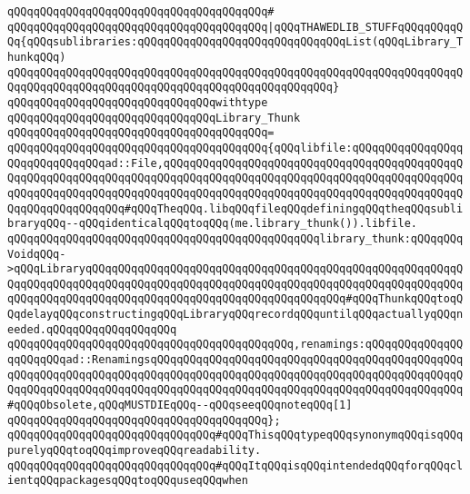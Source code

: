 \verb|qQQqqQQqqQQqqQQqqQQqqQQqqQQqqQQqqQQqqQQq#|\newline
\verb|qQQqqQQqqQQqqQQqqQQqqQQqqQQqqQQqqQQqqQQq|\verb#|qQQqTHAWEDLIB_STUFFqQQqqQQqqQQq{qQQqsublibraries:qQQqqQQqqQQqqQQqqQQqqQQqqQQqqQQqList(qQQqLibrary_ThunkqQQq)#\newline
\verb|qQQqqQQqqQQqqQQqqQQqqQQqqQQqqQQqqQQqqQQqqQQqqQQqqQQqqQQqqQQqqQQqqQQqqQQqqQQqqQQqqQQqqQQqqQQqqQQqqQQqqQQqqQQqqQQqqQQqqQQq}|\newline
\newline
\verb|qQQqqQQqqQQqqQQqqQQqqQQqqQQqqQQqwithtype|\newline
\verb|qQQqqQQqqQQqqQQqqQQqqQQqqQQqqQQqLibrary_Thunk|\newline
\verb|qQQqqQQqqQQqqQQqqQQqqQQqqQQqqQQqqQQqqQQq=|\newline
\verb|qQQqqQQqqQQqqQQqqQQqqQQqqQQqqQQqqQQqqQQq{qQQqlibfile:qQQqqQQqqQQqqQQqqQQqqQQqqQQqqQQqad::File,qQQqqQQqqQQqqQQqqQQqqQQqqQQqqQQqqQQqqQQqqQQqqQQqqQQqqQQqqQQqqQQqqQQqqQQqqQQqqQQqqQQqqQQqqQQqqQQqqQQqqQQqqQQqqQQqqQQqqQQqqQQqqQQqqQQqqQQqqQQqqQQqqQQqqQQqqQQqqQQqqQQqqQQqqQQqqQQqqQQqqQQqqQQqqQQqqQQqqQQqqQQq#qQQqTheqQQq.libqQQqfileqQQqdefiningqQQqtheqQQqsublibraryqQQq--qQQqidenticalqQQqtoqQQq(me.library_thunk()).libfile.|\newline
\verb|qQQqqQQqqQQqqQQqqQQqqQQqqQQqqQQqqQQqqQQqqQQqqQQqlibrary_thunk:qQQqqQQqVoidqQQq->qQQqLibraryqQQqqQQqqQQqqQQqqQQqqQQqqQQqqQQqqQQqqQQqqQQqqQQqqQQqqQQqqQQqqQQqqQQqqQQqqQQqqQQqqQQqqQQqqQQqqQQqqQQqqQQqqQQqqQQqqQQqqQQqqQQqqQQqqQQqqQQqqQQqqQQqqQQqqQQqqQQqqQQqqQQqqQQqqQQqqQQqqQQq#qQQqThunkqQQqtoqQQqdelayqQQqconstructingqQQqLibraryqQQqrecordqQQquntilqQQqactuallyqQQqneeded.qQQqqQQqqQQqqQQqqQQq|\newline
\verb|qQQqqQQqqQQqqQQqqQQqqQQqqQQqqQQqqQQqqQQqqQQq,renamings:qQQqqQQqqQQqqQQqqQQqqQQqad::RenamingsqQQqqQQqqQQqqQQqqQQqqQQqqQQqqQQqqQQqqQQqqQQqqQQqqQQqqQQqqQQqqQQqqQQqqQQqqQQqqQQqqQQqqQQqqQQqqQQqqQQqqQQqqQQqqQQqqQQqqQQqqQQqqQQqqQQqqQQqqQQqqQQqqQQqqQQqqQQqqQQqqQQqqQQqqQQqqQQqqQQqqQQqqQQq#qQQqObsolete,qQQqMUSTDIEqQQq--qQQqseeqQQqnoteqQQq[1]|\newline
\verb|qQQqqQQqqQQqqQQqqQQqqQQqqQQqqQQqqQQqqQQq};|\newline
\newline
\verb|qQQqqQQqqQQqqQQqqQQqqQQqqQQqqQQq#qQQqThisqQQqtypeqQQqsynonymqQQqisqQQqpurelyqQQqtoqQQqimproveqQQqreadability.|\newline
\verb|qQQqqQQqqQQqqQQqqQQqqQQqqQQqqQQq#qQQqItqQQqisqQQqintendedqQQqforqQQqclientqQQqpackagesqQQqtoqQQquseqQQqwhen|\newline
